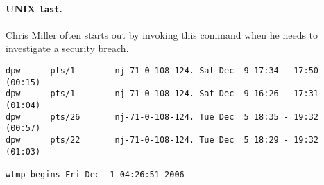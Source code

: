 \documentclass{article}
\begin{document}
\paragraph{UNIX {\tt last}.} Chris Miller often starts out by
invoking this command when he needs to investigate a security breach.

\begin{verbatim}
dpw      pts/1        nj-71-0-108-124. Sat Dec  9 17:34 - 17:50  (00:15)    
dpw      pts/1        nj-71-0-108-124. Sat Dec  9 16:26 - 17:31  (01:04)    
dpw      pts/26       nj-71-0-108-124. Tue Dec  5 18:35 - 19:32  (00:57)    
dpw      pts/22       nj-71-0-108-124. Tue Dec  5 18:29 - 19:32  (01:03)    

wtmp begins Fri Dec  1 04:26:51 2006
\end{verbatim}   
\end{document}
